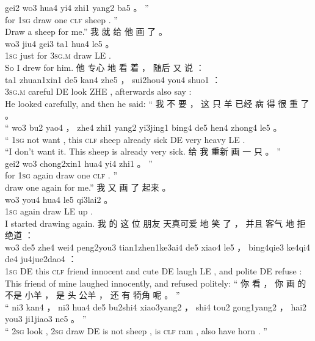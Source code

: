 \documentclass[UTF8]{ctexart}
\begin{document}
\begin{exe}
gei2 wo3 hua4 yi4 zhi1 yang2 ba5 。 ”
\\
for \textsc{1sg} draw one \textsc{clf} sheep {} . ''
\\
\trans Draw a sheep for me.''
\ex
\glll
我 就 给 他 画 了 。
\\
wo3 jiu4 gei3 ta1 hua4 le5 。
\\
\textsc{1sg} just for \textsc{3sg.m} draw LE . 
\\
\trans So I drew for him.
\ex
\glll
他 专心 地 看 着 ， 随后 又 说 ：
\\
ta1 zhuan1xin1 de5 kan4 zhe5 ， sui2hou4 you4 shuo1 ：
\\
\textsc{3sg.m} careful DE look ZHE , afterwards also say :
\\
\trans He looked carefully, and then he said:
\ex
\glll
“ 我 不 要 ， 这 只 羊 已经 病 得 很 重 了 。
\\
“ wo3 bu2 yao4 ， zhe4 zhi1 yang2 yi3jing1 bing4 de5 hen4 zhong4 le5 。
\\
`` \textsc{1sg} not want , this \textsc{clf} sheep already sick DE very heavy LE . 
\\
\trans ``I don't want it. This sheep is already very sick. 
\ex
\glll
给 我 重新 画 一 只 。 ”
\\
gei2 wo3 chong2xin1 hua4 yi4 zhi1 。 ”
\\
for \textsc{1sg} again draw one \textsc{clf} . ''
\\
\trans draw one again for me.''
\ex
\glll
我 又 画 了 起来 。
\\
wo3 you4 hua4 le5 qi3lai2 。
\\
\textsc{1sg} again draw LE up .
\\
\trans I started drawing again.
\ex
\glll
我 的 这 位 朋友 天真可爱 地 笑 了 ， 并且 客气 地 拒绝道 ：
\\
wo3 de5 zhe4 wei4 peng2you3 tian1zhen1ke3ai4 de5 xiao4 le5 ， bing4qie3 ke4qi4 de4 ju4jue2dao4 ：
\\
\textsc{1sg} DE this \textsc{clf} friend {innocent and cute} DE laugh LE , and polite DE refuse :
\\
\trans This friend of mine laughed innocently, and refused politely:
\ex
\glll
“ 你 看 ， 你 画 的 不是 小羊 ， 是 头 公羊 ， 还 有 犄角 呢 。 ”
\\
“ ni3 kan4 ， ni3 hua4 de5 bu2shi4 xiao3yang2 ， shi4 tou2 gong1yang2 ， hai2 you3 ji1jiao3 ne5 。 ”
\\
`` \textsc{2sg} look , \textsc{2sg} draw DE {is not} sheep , is \textsc{clf} ram , also have horn {} . ''
\\

\end{exe}
\end{document}
